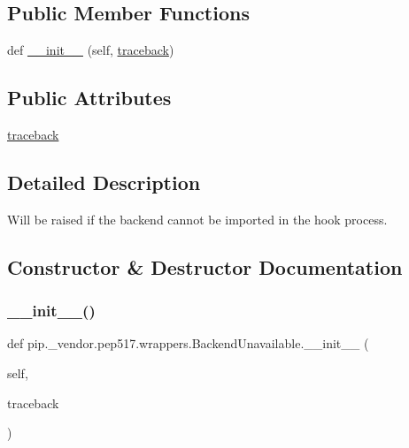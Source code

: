\subsection*{Public Member Functions}
\begin{DoxyCompactItemize}
\item 
def \hyperlink{classpip_1_1__vendor_1_1pep517_1_1wrappers_1_1BackendUnavailable_a51a30f94f5def0b944c2b1a697efa001}{\+\_\+\+\_\+init\+\_\+\+\_\+} (self, \hyperlink{classpip_1_1__vendor_1_1pep517_1_1wrappers_1_1BackendUnavailable_abdd39ad076fb2dd049cfb9f4d6182e14}{traceback})
\end{DoxyCompactItemize}
\subsection*{Public Attributes}
\begin{DoxyCompactItemize}
\item 
\hyperlink{classpip_1_1__vendor_1_1pep517_1_1wrappers_1_1BackendUnavailable_abdd39ad076fb2dd049cfb9f4d6182e14}{traceback}
\end{DoxyCompactItemize}


\subsection{Detailed Description}
\begin{DoxyVerb}Will be raised if the backend cannot be imported in the hook process.\end{DoxyVerb}
 

\subsection{Constructor \& Destructor Documentation}
\mbox{\label{classpip_1_1__vendor_1_1pep517_1_1wrappers_1_1BackendUnavailable_a51a30f94f5def0b944c2b1a697efa001}} 
\subsubsection{\texorpdfstring{\+\_\+\+\_\+init\+\_\+\+\_\+()}{\_\_init\_\_()}}
{\footnotesize\ttfamily def pip.\+\_\+vendor.\+pep517.\+wrappers.\+Backend\+Unavailable.\+\_\+\+\_\+init\+\_\+\+\_\+ (\begin{DoxyParamCaption}\item[{}]{self,  }\item[{}]{traceback }\end{DoxyParamCaption})}



